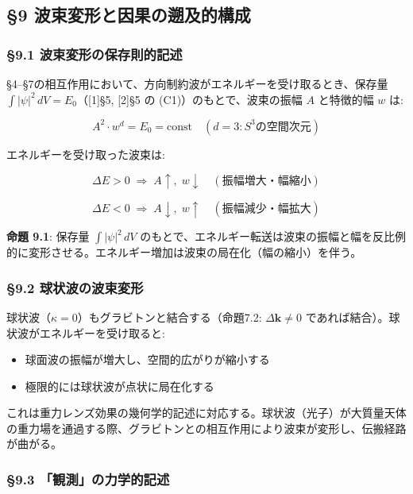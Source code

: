 \documentclass[
  a4paper,11pt]{ltjsarticle}
\providecommand{\tightlist}{%
  \setlength{\itemsep}{0pt}\setlength{\parskip}{0pt}}
\theoremstyle{definition}
\theoremstyle{remark}
\begin{document}
\subsection{§9
波束変形と因果の遡及的構成}\label{ux6ce2ux675fux5909ux5f62ux3068ux56e0ux679cux306eux9061ux53caux7684ux69cbux6210}

\subsubsection{§9.1
波束変形の保存則的記述}\label{ux6ce2ux675fux5909ux5f62ux306eux4fddux5b58ux5247ux7684ux8a18ux8ff0}

§4--§7の相互作用において、方向制約波がエネルギーを受け取るとき、保存量
\(\int |\psi|^2 \, dV = E_0\)（{[}1{]}§5, {[}2{]}§5 の
(C1)）のもとで、波束の振幅 \(A\) と特徴的幅 \(w\) は:

\[A^2 \cdot w^d = E_0 = \text{const} \quad (d = 3: S^3 \text{の空間次元})\]

エネルギーを受け取った波束は:

\[\Delta E > 0 \;\Rightarrow\; A \uparrow,\; w \downarrow \quad (\text{振幅増大・幅縮小})\]

\[\Delta E < 0 \;\Rightarrow\; A \downarrow,\; w \uparrow \quad (\text{振幅減少・幅拡大})\]

\textbf{命題 9.1}: 保存量 \(\int |\psi|^2 \, dV\)
のもとで、エネルギー転送は波束の振幅と幅を反比例的に変形させる。エネルギー増加は波束の局在化（幅の縮小）を伴う。

\subsubsection{§9.2
球状波の波束変形}\label{ux7403ux72b6ux6ce2ux306eux6ce2ux675fux5909ux5f62}

球状波（\(\kappa = 0\)）もグラビトンと結合する（命題7.2:
\(\Delta\mathbf{k} \neq 0\)
であれば結合）。球状波がエネルギーを受け取ると:

\begin{itemize}
\tightlist
\item
  球面波の振幅が増大し、空間的広がりが縮小する
\item
  極限的には球状波が点状に局在化する
\end{itemize}

これは重力レンズ効果の幾何学的記述に対応する。球状波（光子）が大質量天体の重力場を通過する際、グラビトンとの相互作用により波束が変形し、伝搬経路が曲がる。

\subsubsection{§9.3
「観測」の力学的記述}\label{ux89b3ux6e2cux306eux529bux5b66ux7684ux8a18ux8ff0}
\end{document}
